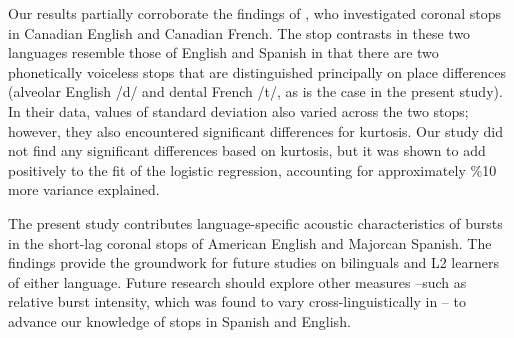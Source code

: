 \documentclass[a4paper,10pt,twocolumn]{article}\usepackage[]{graphicx}\usepackage[]{color}
\begin{document}
	Our results partially corroborate the findings of \cite{sundara2005acoustic}, who investigated coronal stops in Canadian English and Canadian French. The stop contrasts in these two languages resemble those of English and Spanish in that there are two phonetically voiceless stops that are distinguished principally on place differences (alveolar English /d/ and dental French /t/, as is the case in the present study). In their data, values of standard deviation also varied across the two stops; however, they also encountered significant differences for kurtosis. Our study did not find any significant differences based on kurtosis, but it was shown to add positively to the fit of the logistic regression, accounting for approximately \%10 more variance explained. 

	The present study contributes language-specific acoustic characteristics of bursts in the short-lag coronal stops of American English and Majorcan Spanish. The findings provide the groundwork for future studies on bilinguals and L2 learners of either language. Future research should explore other measures --such as relative burst intensity, which was found to vary cross-linguistically in \cite{sundara2005acoustic}-- to advance our knowledge of stops in Spanish and English. 


\newpage
 

\vspace{-.15in}
\theendnotes
\end{document}
